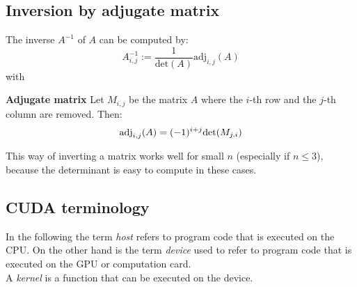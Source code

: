 \subsection*{Inversion by adjugate matrix}
The inverse $A^{-1}$ of $A$ can be computed by:
\begin{equation}
	A^{-1}_{i,j} := \frac{1}{\text{det}(A)} \text{adj}_{i,j}(A)
\end{equation}
with
\begin{definition}
	\textbf{Adjugate matrix} Let $M_{i,j}$ be the matrix $A$ where the $i$-th row and the $j$-th column are removed. Then:
	\[ \text{\textnormal{adj}}_{i,j}(A) = (-1)^{i+j} \text{\textnormal{det}}(M_{j,i}) \]
\end{definition}
This way of inverting a matrix works well for small $n$ (especially if $n \leq 3$), because the determinant is easy to compute in these cases.\\

\subsection*{CUDA terminology}
In the following the term \emph{host} refers to program code that is executed on the CPU. On the other hand is the term \emph{device} used to refer to program code that is executed on the GPU or computation card.\\
A \emph{kernel} is a function that can be executed on the device.

